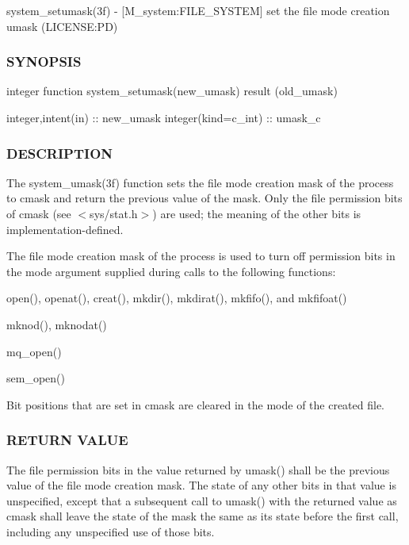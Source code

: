 system\+\_\+setumask(3f) -\/ \mbox{[}M\+\_\+system\+:F\+I\+L\+E\+\_\+\+S\+Y\+S\+T\+EM\mbox{]} set the file mode creation umask (L\+I\+C\+E\+N\+SE\+:PD) \subsubsection*{S\+Y\+N\+O\+P\+S\+IS}

integer function system\+\_\+setumask(new\+\_\+umask) result (old\+\_\+umask)

integer,intent(in) \+:\+: new\+\_\+umask integer(kind=c\+\_\+int) \+:\+: umask\+\_\+c

\subsubsection*{D\+E\+S\+C\+R\+I\+P\+T\+I\+ON}

The system\+\_\+umask(3f) function sets the file mode creation mask of the process to cmask and return the previous value of the mask. Only the file permission bits of cmask (see $<$sys/stat.\+h$>$) are used; the meaning of the other bits is implementation-\/defined.

The file mode creation mask of the process is used to turn off permission bits in the mode argument supplied during calls to the following functions\+:


\begin{DoxyItemize}
\item open(), openat(), creat(), mkdir(), mkdirat(), mkfifo(), and mkfifoat()
\item mknod(), mknodat()
\item mq\+\_\+open()
\item sem\+\_\+open()
\end{DoxyItemize}

Bit positions that are set in cmask are cleared in the mode of the created file.

\subsubsection*{R\+E\+T\+U\+RN V\+A\+L\+UE}

The file permission bits in the value returned by umask() shall be the previous value of the file mode creation mask. The state of any other bits in that value is unspecified, except that a subsequent call to umask() with the returned value as cmask shall leave the state of the mask the same as its state before the first call, including any unspecified use of those bits.

